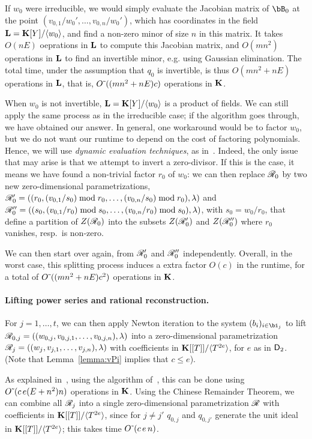 \documentclass[12pt]{article}
\begin{document}
If $w_0$ were irreducible, we would simply evaluate the Jacobian
matrix of $\bB_0$ at the point $(v_{0,1}/w_0',\dots,v_{0,n}/w_0')$,
which has coordinates in the field $\mathbf{L}=\mathbf{K}[Y]/\langle w_0 \rangle$,
and find a non-zero minor of size $n$ in this matrix. It takes
$O(n E)$ oeprations in $\mathbf{L}$ to compute this Jacobian matrix, and
$O(mn^2)$ operations in $\mathbf{L}$ to find an invertible minor, e.g. using
Gaussian elimination. The total time, under the assumption that $q_0$
is invertible, is thus $O(mn^2 + nE)$ operations in $\mathbf{L}$, that is,
${O}{\,\tilde{ }\,}( (mn^2 + nE) c)$ operations in $\mathbf{K}$.

When $w_0$ is not invertible, $\mathbf{L}=\mathbf{K}[Y]/\langle w_0 \rangle$ is a
product of fields. We can still apply the same process as in the
irreducible case; if the algorithm goes through, we have obtained our
answer. In general, one workaround would be to factor $w_0$, but we do
not want our runtime to depend on the cost of factoring
polynomials. Hence, we will use {\em dynamic evaluation techniques},
as in~\cite{D5}. Indeed, the only issue that may arise is that we
attempt to invert a zero-divisor. If this is the case, it means we
have found a non-trivial factor $r_0$ of $w_0$: we can then replace
$\mathscr{R}_0$ by two new zero-dimensional parametrizations,
$\mathscr{R}'_0=((r_0,(v_{0,1}/s_0) \bmod r_0,\dots,(v_{0,n}/s_0)\bmod
r_0),\lambda)$
and
$\mathscr{R}''_0=((s_0,(v_{0,1}/r_0) \bmod s_0,\dots,(v_{0,n}/ r_0)\bmod
s_0),\lambda)$,
with $s_0=w_0/r_0$, that define a partition of $Z(\mathscr{R}_0)$ into the
subsets $Z(\mathscr{R}'_0)$ and $Z(\mathscr{R}''_0)$ where $r_0$ vanishes, resp.\
is non-zero.

We can then start over again, from $\mathscr{R}'_0$ and $\mathscr{R}''_0$
independently. Overall, in the worst case, this splitting process 
induces a extra factor $O(c)$ in the runtime, 
for a total of ${O}{\,\tilde{ }\,}( (mn^2 + nE) c^2)$ operations in $\mathbf{K}$.

\paragraph{Lifting power series and rational reconstruction.}
For $j=1,\dots,t$, we can then apply Newton iteration to the system
$(b_i)_{i \in \bi_j}$ to lift
$\mathscr{R}_{0,j}=((w_{0,j},v_{0,j,1},\dots,v_{0,j,n}),\lambda)$ into a
zero-dimensional parametrization
$\mathscr{R}_{j}=((w_{j},v_{j,1},\dots,v_{j,n}),\lambda)$ with coefficients
in $\mathbf{K}[[T]]/\langle T^{2e}\rangle$, for $e$ as in ${\mathsf{D}}_2$.
(Note that Lemma~\ref{lemma:vPi} implies that $c \le e$).

As explained in~\cite[Section~2.2]{SaSc16}, using the algorithm
of~\cite{GiLeSa01}, this can be done using ${O}{\,\tilde{ }\,}(c\,e (E+n^2)n)$
operations in $\mathbf{K}$.  Using the Chinese Remainder Theorem, we can
combine all $\mathscr{R}_{j}$ into a single zero-dimensional parametrization
$\mathscr{R}$ with coefficients in $\mathbf{K}[[T]]/\langle T^{2e}\rangle$, since
for $j\ne j'$ $q_{0,j}$ and $q_{0,j'}$ generate the unit ideal in
$\mathbf{K}[[T]]/\langle T^{2e}\rangle$; this takes time 
${O}{\,\tilde{ }\,}(c\,e\,n)$.
\end{document}
